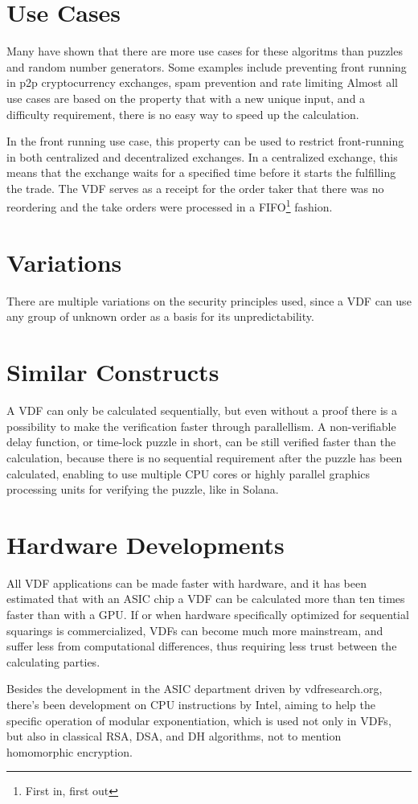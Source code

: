 \section{Use Cases}
Many have shown that there are more use cases for these algoritms than puzzles and random number generators. Some examples include preventing front running in p2p cryptocurrency exchanges, spam prevention and rate limiting\cite{noauthor_undated-hk} Almost all use cases are based on the property that with a new unique input, and a difficulty requirement, there is no easy way to speed up the calculation.

In the front running use case, this property can be used to restrict front-running in both centralized and decentralized exchanges. In a centralized exchange, this means that the exchange waits for a specified time before it starts the fulfilling the trade. The VDF serves as a receipt for the order taker that there was no reordering and the take orders were processed in a FIFO\footnote{First in, first out} fashion.\cite{Cline2020-wb}

\section{Variations}
There are multiple variations on the security principles used, since a VDF can use any group of unknown order as a basis for its unpredictability.

\section{Similar Constructs}
A VDF can only be calculated sequentially, but even without a proof there is a possibility to make the verification faster through parallellism. A non-verifiable delay function, or time-lock puzzle in short, can be still verified faster than the calculation, because there is no sequential requirement after the puzzle has been calculated, enabling to use multiple CPU cores or highly parallel graphics processing units for verifying the puzzle, like in Solana.\cite{Yakovenko2018-zn} 

\section{Hardware Developments}
All VDF applications can be made faster with hardware, and it has been estimated that with an ASIC chip a VDF can be calculated more than ten times faster than with a GPU.\cite{Stanford_Video2020-ap} If or when hardware specifically optimized for sequential squarings is commercialized, VDFs can become much more mainstream, and suffer less from computational differences, thus requiring less trust between the calculating parties.

Besides the development in the ASIC department driven by vdfresearch.org\cite{noauthor_undated-hk}, there's been development on CPU instructions by Intel, aiming to help the specific operation of modular exponentiation, which is used not only in VDFs, but also in classical RSA, DSA, and DH algorithms, not to mention homomorphic encryption.\cite{Drucker2019-cx} 
